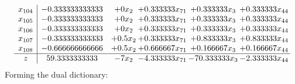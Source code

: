 \documentclass[11pt]{article}
\begin{document}
\[\begin{array}{c| c c@{\hskip 2pt} c@{\hskip 2pt} c@{\hskip 2pt} c@{\hskip 2pt} }
 x_{104}   &  -0.333333333333 & + 0 x_{2} & + 0.333333 x_{71} & + 0.333333 x_{3} & + 0.333333 x_{44}\\
 x_{105}   &  -0.333333333333 & + 0 x_{2} & + 0.333333 x_{71} & + 0.333333 x_{3} & + 0.333333 x_{44}\\
 x_{106}   &  -0.333333333333 & + 0 x_{2} & + 0.333333 x_{71} & + 0.333333 x_{3} & + 0.333333 x_{44}\\
 x_{107}   &  -0.333333333333 & + 0.5 x_{2} & + 0.333333 x_{71} & + 0.833333 x_{3} & + 0.833333 x_{44}\\
 x_{108}   &  -0.666666666666 & + 0.5 x_{2} & + 0.666667 x_{71} & + 0.166667 x_{3} & + 0.166667 x_{44}\\
\hline
z    &  59.3333333333 & -7 x_{2} & -4.333333 x_{71} & -70.333333 x_{3} & -2.333333 x_{44}\\
\end{array}\]
Forming the dual dictionary:
\end{document}
